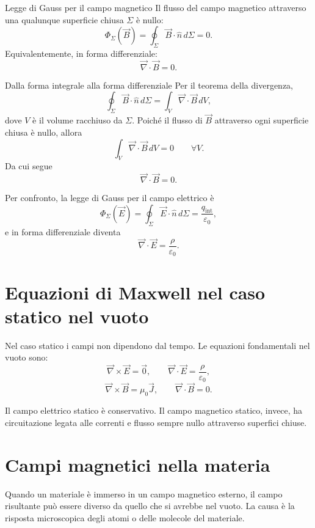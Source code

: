 \documentclass[a4paper]{article}
\begin{document}
\begin{snippettheorem}{Legge di Gauss per il campo magnetico}
Il flusso del campo magnetico attraverso una qualunque superficie chiusa \(\Sigma\) è nullo:
\[
    \Phi_\Sigma(\vec{B})=\oint_\Sigma \vec{B}\cdot\hat{n}\,d\Sigma=0.
\]
Equivalentemente, in forma differenziale:
\[
    \vec{\nabla}\cdot\vec{B}=0.
\]
\end{snippettheorem}

\begin{snippetproof}{Dalla forma integrale alla forma differenziale}
Per il teorema della divergenza,
\[
    \oint_\Sigma \vec{B}\cdot\hat{n}\,d\Sigma=
    \int_V \vec{\nabla}\cdot\vec{B}\,dV,
\]
dove \(V\) è il volume racchiuso da \(\Sigma\). Poiché il flusso di \(\vec{B}\) attraverso ogni superficie chiusa è nullo, allora
\[
    \int_V \vec{\nabla}\cdot\vec{B}\,dV=0
    \qquad \forall V.
\]
Da cui segue
\[
    \vec{\nabla}\cdot\vec{B}=0.
\]
\end{snippetproof}

Per confronto, la legge di Gauss per il campo elettrico è
\[
\Phi_\Sigma(\vec{E})=\oint_\Sigma \vec{E}\cdot\hat{n}\,d\Sigma=
\frac{q_{\mathrm{int}}}{\varepsilon_0},
\]
e in forma differenziale diventa
\[
\vec{\nabla}\cdot\vec{E}=\frac{\rho}{\varepsilon_0}.
\]

\section{Equazioni di Maxwell nel caso statico nel vuoto}

Nel caso statico i campi non dipendono dal tempo. Le equazioni fondamentali nel vuoto sono:
\[
\vec{\nabla}\times\vec{E}=\vec{0},
\qquad
\vec{\nabla}\cdot\vec{E}=\frac{\rho}{\varepsilon_0},
\]
\[
\vec{\nabla}\times\vec{B}=\mu_0\vec{J},
\qquad
\vec{\nabla}\cdot\vec{B}=0.
\]

Il campo elettrico statico è conservativo. Il campo magnetico statico, invece, ha circuitazione legata alle correnti e flusso sempre nullo attraverso superfici chiuse.

\section{Campi magnetici nella materia}

Quando un materiale è immerso in un campo magnetico esterno, il campo risultante può essere diverso da quello che si avrebbe nel vuoto. La causa è la risposta microscopica degli atomi o delle molecole del materiale.
\end{document}
